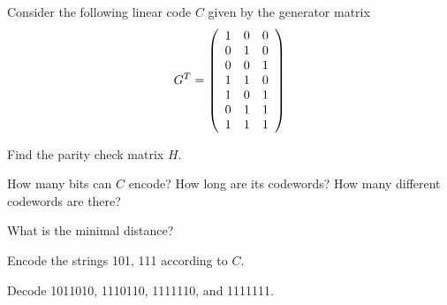 \documentclass[a4paper,10pt,landscape,twocolumn]{scrartcl}
\begin{document}
\begin{exercise}
Consider the following linear code $C$ given by the generator matrix
\[
G^T = \left(
\begin{array}{c c c}
1&0&0\\
0&1&0\\
0&0&1\\
1&1&0\\
1&0&1\\
0&1&1\\
1&1&1
\end{array}
\right)
\]

\begin{subex}
Find the parity check matrix $H$.
\end{subex}

\begin{subex}
How many bits can $C$ encode? How long are its codewords? How many different codewords are there?
\end{subex}

\begin{subex}
What is the minimal distance?
\end{subex}

\begin{subex}
Encode the strings 101, 111 according to $C$.
\end{subex}

\begin{subex}
Decode 1011010, 1110110, 1111110, and 1111111.
\end{subex}
\end{exercise}
\end{document}
